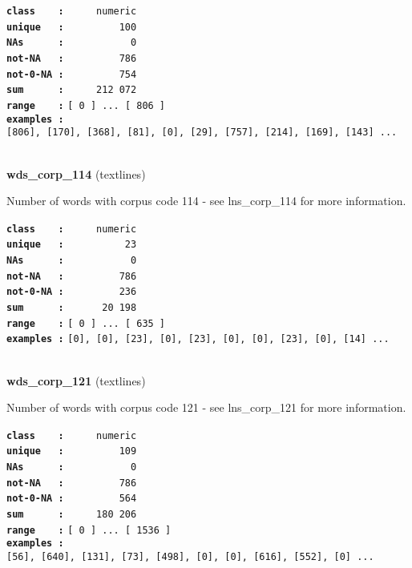 \documentclass[]{article}
\begin{document}
\textbf{\texttt{class\ \ \ \ :}} \texttt{~~~~~numeric}\\
\textbf{\texttt{unique\ \ \ :}} \texttt{~~~~~~~~~100}\\
\textbf{\texttt{NAs\ \ \ \ \ \ :}} \texttt{~~~~~~~~~~~0}\\
\textbf{\texttt{not-NA\ \ \ :}} \texttt{~~~~~~~~~786}\\
\textbf{\texttt{not-0-NA\ :}} \texttt{~~~~~~~~~754}\\
\textbf{\texttt{sum\ \ \ \ \ \ :}} \texttt{~~~~~212~072}\\
\textbf{\texttt{range\ \ \ \ :}}
\texttt{{[}\ 0\ {]}\ ...\ {[}\ 806\ {]}}\\
\textbf{\texttt{examples\ :}}
\texttt{{[}806{]},\ {[}170{]},\ {[}368{]},\ {[}81{]},\ {[}0{]},\ {[}29{]},\ {[}757{]},\ {[}214{]},\ {[}169{]},\ {[}143{]}\ ...}\\

~

\textbf{wds\_corp\_114} (textlines)

Number of words with corpus code 114 - see lns\_corp\_114 for more
information.

\textbf{\texttt{class\ \ \ \ :}} \texttt{~~~~~numeric}\\
\textbf{\texttt{unique\ \ \ :}} \texttt{~~~~~~~~~~23}\\
\textbf{\texttt{NAs\ \ \ \ \ \ :}} \texttt{~~~~~~~~~~~0}\\
\textbf{\texttt{not-NA\ \ \ :}} \texttt{~~~~~~~~~786}\\
\textbf{\texttt{not-0-NA\ :}} \texttt{~~~~~~~~~236}\\
\textbf{\texttt{sum\ \ \ \ \ \ :}} \texttt{~~~~~~20~198}\\
\textbf{\texttt{range\ \ \ \ :}}
\texttt{{[}\ 0\ {]}\ ...\ {[}\ 635\ {]}}\\
\textbf{\texttt{examples\ :}}
\texttt{{[}0{]},\ {[}0{]},\ {[}23{]},\ {[}0{]},\ {[}23{]},\ {[}0{]},\ {[}0{]},\ {[}23{]},\ {[}0{]},\ {[}14{]}\ ...}\\

~

\textbf{wds\_corp\_121} (textlines)

Number of words with corpus code 121 - see lns\_corp\_121 for more
information.

\textbf{\texttt{class\ \ \ \ :}} \texttt{~~~~~numeric}\\
\textbf{\texttt{unique\ \ \ :}} \texttt{~~~~~~~~~109}\\
\textbf{\texttt{NAs\ \ \ \ \ \ :}} \texttt{~~~~~~~~~~~0}\\
\textbf{\texttt{not-NA\ \ \ :}} \texttt{~~~~~~~~~786}\\
\textbf{\texttt{not-0-NA\ :}} \texttt{~~~~~~~~~564}\\
\textbf{\texttt{sum\ \ \ \ \ \ :}} \texttt{~~~~~180~206}\\
\textbf{\texttt{range\ \ \ \ :}}
\texttt{{[}\ 0\ {]}\ ...\ {[}\ 1536\ {]}}\\
\textbf{\texttt{examples\ :}}
\texttt{{[}56{]},\ {[}640{]},\ {[}131{]},\ {[}73{]},\ {[}498{]},\ {[}0{]},\ {[}0{]},\ {[}616{]},\ {[}552{]},\ {[}0{]}\ ...}\\
\end{document}
